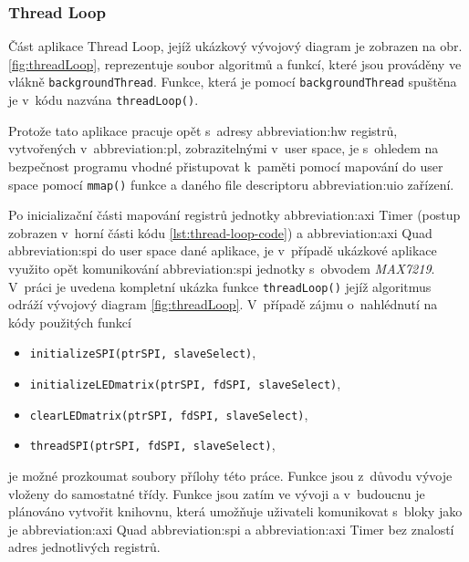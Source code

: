 \documentclass[a4paper, twoside, 11pt]{article}
\newcommand{\fbar}{\FloatBarrier}
\begin{document}
 	\fbar
 	\subsubsection{Thread Loop}\label{subsubsec:thread-loop}
 		Část aplikace Thread Loop, jejíž ukázkový vývojový diagram je zobrazen na obr. \ref{fig:threadLoop}, reprezentuje soubor algoritmů a funkcí, které jsou prováděny ve vlákně \texttt{backgroundThread}. Funkce, která je pomocí \texttt{backgroundThread} spuštěna je v~kódu nazvána \texttt{threadLoop()}.\par
		Protože tato aplikace pracuje opět s~adresy \gls{abbreviation:hw} registrů, vytvořených v~\gls{abbreviation:pl}, zobrazitelnými v~user space, je s~ohledem na bezpečnost programu vhodné přistupovat k~paměti pomocí mapování do user space pomocí \texttt{mmap()} funkce a daného file descriptoru \gls{abbreviation:uio} zařízení.\par
		Po inicializační části mapování registrů jednotky \gls{abbreviation:axi} Timer (postup zobrazen v~horní části kódu \ref{lst:thread-loop-code}) a \gls{abbreviation:axi} Quad \gls{abbreviation:spi} do user space dané aplikace, je v~případě ukázkové aplikace využito opět komunikování \gls{abbreviation:spi} jednotky s~obvodem \textit{MAX7219}. V~práci je uvedena kompletní ukázka funkce \texttt{threadLoop()} jejíž algoritmus odráží vývojový diagram \ref{fig:threadLoop}. V~případě zájmu o~nahlédnutí na kódy použitých funkcí
 		\begin{itemize}
			\item \texttt{initializeSPI(ptrSPI, slaveSelect)},
			\item \texttt{initializeLEDmatrix(ptrSPI, fdSPI, slaveSelect)},
			\item \texttt{clearLEDmatrix(ptrSPI, fdSPI, slaveSelect)},
			\item \texttt{threadSPI(ptrSPI, fdSPI, slaveSelect)},
		\end{itemize}
		   je možné prozkoumat soubory přílohy této práce. Funkce jsou z~důvodu vývoje vloženy do samostatné třídy. Funkce jsou zatím ve vývoji a v~budoucnu je plánováno vytvořit knihovnu, která umožňuje uživateli komunikovat s~bloky jako je \gls{abbreviation:axi} Quad \gls{abbreviation:spi} a \gls{abbreviation:axi} Timer bez znalostí adres jednotlivých registrů.
\end{document}
